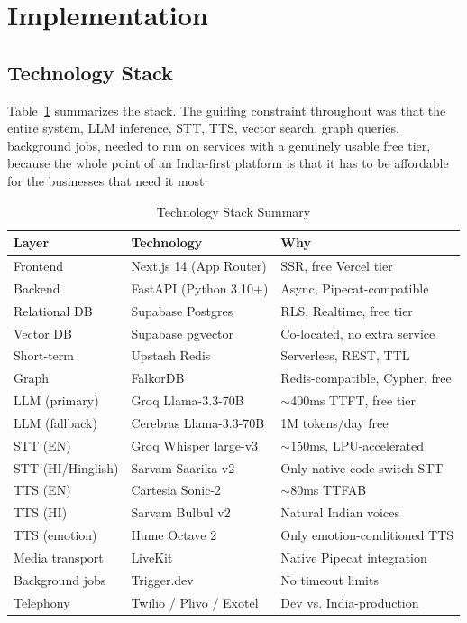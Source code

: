 \documentclass[conference]{IEEEtran}
\begin{document}
\section{Implementation}
\label{sec:implementation}

\subsection{Technology Stack}

Table~\ref{tab:stack} summarizes the stack. The guiding constraint throughout was that the entire system, LLM inference, STT, TTS, vector search, graph queries, background jobs, needed to run on services with a genuinely usable free tier, because the whole point of an India-first platform is that it has to be affordable for the businesses that need it most.

\begin{table}[t]
\centering
\caption{Technology Stack Summary}
\label{tab:stack}
\footnotesize
\begin{tabularx}{\columnwidth}{@{}l l X@{}}
\toprule
\textbf{Layer} & \textbf{Technology} & \textbf{Why} \\
\midrule
Frontend & Next.js 14 (App Router) & SSR, free Vercel tier \\
Backend & FastAPI (Python 3.10+) & Async, Pipecat-compatible \\
Relational DB & Supabase Postgres & RLS, Realtime, free tier \\
Vector DB & Supabase pgvector & Co-located, no extra service \\
Short-term & Upstash Redis & Serverless, REST, TTL \\
Graph & FalkorDB & Redis-compatible, Cypher, free \\
LLM (primary) & Groq Llama-3.3-70B & $\sim$400ms TTFT, free tier \\
LLM (fallback) & Cerebras Llama-3.3-70B & 1M tokens/day free \\
STT (EN) & Groq Whisper large-v3 & $\sim$150ms, LPU-accelerated \\
STT (HI/Hinglish) & Sarvam Saarika v2 & Only native code-switch STT \\
TTS (EN) & Cartesia Sonic-2 & $\sim$80ms TTFAB \\
TTS (HI) & Sarvam Bulbul v2 & Natural Indian voices \\
TTS (emotion) & Hume Octave 2 & Only emotion-conditioned TTS \\
Media transport & LiveKit & Native Pipecat integration \\
Background jobs & Trigger.dev & No timeout limits \\
Telephony & Twilio / Plivo / Exotel & Dev vs. India-production \\
\bottomrule
\end{tabularx}
\end{table}
\end{document}
